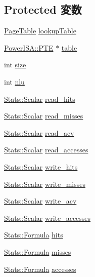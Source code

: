 \subsection*{Protected 変数}
\begin{DoxyCompactItemize}
\item 
\hyperlink{classPageTable}{PageTable} \hyperlink{classPowerISA_1_1TLB_a4d5c35d797dc31aad758dee75916238f}{lookupTable}
\item 
\hyperlink{structPowerISA_1_1PTE}{PowerISA::PTE} $\ast$ \hyperlink{classPowerISA_1_1TLB_aaa2455839f9586ce25fefa06fdc4e952}{table}
\item 
int \hyperlink{classPowerISA_1_1TLB_a439227feff9d7f55384e8780cfc2eb82}{size}
\item 
int \hyperlink{classPowerISA_1_1TLB_a4a3ee7780f871ead437ece349ddc2147}{nlu}
\item 
\hyperlink{classStats_1_1Scalar}{Stats::Scalar} \hyperlink{classPowerISA_1_1TLB_a766fdbd2ab7d588c3c9fa426ce395ed6}{read\_\-hits}
\item 
\hyperlink{classStats_1_1Scalar}{Stats::Scalar} \hyperlink{classPowerISA_1_1TLB_a6fb393c9489d735739552c2a351f07f4}{read\_\-misses}
\item 
\hyperlink{classStats_1_1Scalar}{Stats::Scalar} \hyperlink{classPowerISA_1_1TLB_af50813bd757bd59aa3618aa99377760a}{read\_\-acv}
\item 
\hyperlink{classStats_1_1Scalar}{Stats::Scalar} \hyperlink{classPowerISA_1_1TLB_a2c9dc5a6baf7fbd1ae7fc00b0a57fe56}{read\_\-accesses}
\item 
\hyperlink{classStats_1_1Scalar}{Stats::Scalar} \hyperlink{classPowerISA_1_1TLB_ab3172bfd014e75dcad1b0a2a91de59dd}{write\_\-hits}
\item 
\hyperlink{classStats_1_1Scalar}{Stats::Scalar} \hyperlink{classPowerISA_1_1TLB_af8519a07f8f1f76c8fff9c9a1aaa4638}{write\_\-misses}
\item 
\hyperlink{classStats_1_1Scalar}{Stats::Scalar} \hyperlink{classPowerISA_1_1TLB_a764f5ef97bfcb1ba3ad05704de5a3a32}{write\_\-acv}
\item 
\hyperlink{classStats_1_1Scalar}{Stats::Scalar} \hyperlink{classPowerISA_1_1TLB_af3301e9dd0bb91de161b7bafefade7f3}{write\_\-accesses}
\item 
\hyperlink{classStats_1_1Formula}{Stats::Formula} \hyperlink{classPowerISA_1_1TLB_a224eed77bfb7a27359c9c3c1acbdbfaa}{hits}
\item 
\hyperlink{classStats_1_1Formula}{Stats::Formula} \hyperlink{classPowerISA_1_1TLB_a4b8b96257f1e97cd5730673f38f9571c}{misses}
\item 
\hyperlink{classStats_1_1Formula}{Stats::Formula} \hyperlink{classPowerISA_1_1TLB_a1929e1032289676f78e07e4c6bc55369}{accesses}
\end{DoxyCompactItemize}


